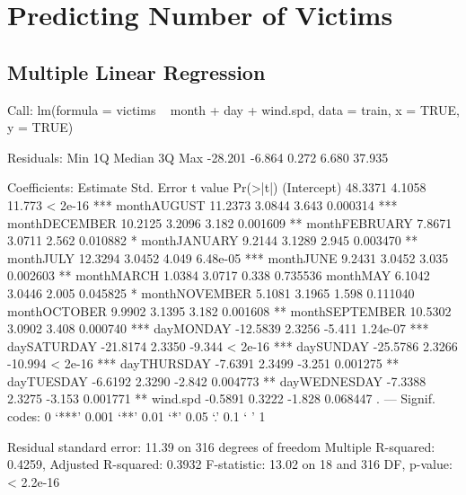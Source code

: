 \documentclass[11pt, a4paper]{article}
\begin{document}
\pagebreak
\section{Predicting Number of Victims}

\subsection{Multiple Linear Regression}

\begin{Schunk}
\begin{Soutput}
Call:
lm(formula = victims ~ month + day + wind.spd, data = train, 
    x = TRUE, y = TRUE)

Residuals:
    Min      1Q  Median      3Q     Max 
-28.201  -6.864   0.272   6.680  37.935 

Coefficients:
               Estimate Std. Error t value Pr(>|t|)    
(Intercept)     48.3371     4.1058  11.773  < 2e-16 ***
monthAUGUST     11.2373     3.0844   3.643 0.000314 ***
monthDECEMBER   10.2125     3.2096   3.182 0.001609 ** 
monthFEBRUARY    7.8671     3.0711   2.562 0.010882 *  
monthJANUARY     9.2144     3.1289   2.945 0.003470 ** 
monthJULY       12.3294     3.0452   4.049 6.48e-05 ***
monthJUNE        9.2431     3.0452   3.035 0.002603 ** 
monthMARCH       1.0384     3.0717   0.338 0.735536    
monthMAY         6.1042     3.0446   2.005 0.045825 *  
monthNOVEMBER    5.1081     3.1965   1.598 0.111040    
monthOCTOBER     9.9902     3.1395   3.182 0.001608 ** 
monthSEPTEMBER  10.5302     3.0902   3.408 0.000740 ***
dayMONDAY      -12.5839     2.3256  -5.411 1.24e-07 ***
daySATURDAY    -21.8174     2.3350  -9.344  < 2e-16 ***
daySUNDAY      -25.5786     2.3266 -10.994  < 2e-16 ***
dayTHURSDAY     -7.6391     2.3499  -3.251 0.001275 ** 
dayTUESDAY      -6.6192     2.3290  -2.842 0.004773 ** 
dayWEDNESDAY    -7.3388     2.3275  -3.153 0.001771 ** 
wind.spd        -0.5891     0.3222  -1.828 0.068447 .  
---
Signif. codes:  0 ‘***’ 0.001 ‘**’ 0.01 ‘*’ 0.05 ‘.’ 0.1 ‘ ’ 1

Residual standard error: 11.39 on 316 degrees of freedom
Multiple R-squared:  0.4259,	Adjusted R-squared:  0.3932 
F-statistic: 13.02 on 18 and 316 DF,  p-value: < 2.2e-16
\end{Soutput}
\end{Schunk}
\end{document}
